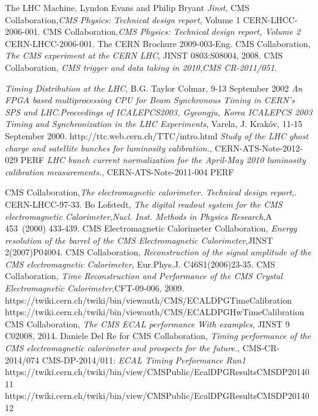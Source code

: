 \begin{thebibliography}{9}
 The LHC Machine, Lyndon Evans and Philip Bryant \textit{Jinst},
CMS Collaboration,\textit{CMS Physics: Technical design report}, Volume 1 CERN-LHCC-2006-001.
CMS Collaboration,\textit{CMS Physics: Technical design report, Volume 2} CERN-LHCC-2006-001.
 The CERN Brochure 2009-003-Eng.
CMS Collaboration, \textit{The CMS experiment at the CERN LHC}, JINST 0803:S08004, 2008.
CMS Collaboration, \textit{CMS trigger and data taking in 2010},\emph{CMS CR-2011/051}.

 \textit{Timing Distribution at the LHC},  B.G. Taylor Colmar, 9-13 September 2002
 \textit{An FPGA based multiprocessing CPU for Beam
Synchronous Timing in CERN’s SPS and LHC}.\emph{Proceedings of ICALEPCS2003, Gyeongju, Korea
ICALEPCS 2003}
 \textit{Timing and Synchronization in the LHC Experiments}, Varela, J. Krakóv, 11-15 September 2000.
 http://ttc.web.cern.ch/TTC/intro.html
 \textit{Study of the LHC ghost charge and
satellite bunches for luminosity calibration.}, CERN-ATS-Note-2012-029 PERF
 \textit{LHC bunch current normalization for the April-May 2010 luminosity calibration measurements.}, CERN-ATS-Note-2011-004 PERF

CMS Collaboration,\textit{The electromagnetic calorimeter. Technical design report},. CERN-LHCC-97-33.
 Bo Lofstedt, \textit{The digital readout system for the CMS electromagnetic Calorimeter},\textit{Nucl. Inst.  Methods in Physics Research},A 453~(2000) 433-439.
CMS Electromagnetic Calorimeter Collaboration, \textit{Energy resolution of the barrel of the CMS Electromagnetic Calorimeter},JINST 2(2007)P04004.
CMS Collaboration, \textit{Reconstruction of the signal amplitude of the CMS electromagnetic Calorimeter}, Eur.Phys.J. C46S1(2006)23-35.
CMS Collaboration, \textit{Time Reconstruction and Performance of the CMS Crystal Electromagnetic Calorimeter},CFT-09-006, 2009.
 https://twiki.cern.ch/twiki/bin/viewauth/CMS/ECALDPGTimeCalibration
https://twiki.cern.ch/twiki/bin/viewauth/CMS/ECALDPGHwTimeCalibration
CMS Collaboration, \textit{The CMS ECAL performance With examples}, JINST 9 C02008, 2014.
 Daniele Del Re for CMS Collaboration, \textit{Timing performance of the CMS electromagnetic calorimeter and prospects for the future.}, CMS-CR-2014/074
 CMS-DP-2014/011: \textit{ECAL Timing Performance Run1}
 https://twiki.cern.ch/twiki/bin/view/CMSPublic/EcalDPGResultsCMSDP2014011
https://twiki.cern.ch/twiki/bin/view/CMSPublic/EcalDPGResultsCMSDP2014012


\end{thebibliography}
